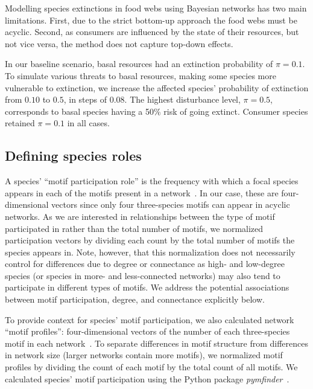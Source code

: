 \documentclass[12pt]{article}
\begin{document}
\begin{spacing}{2.0}
		
		Modelling species extinctions in food webs using Bayesian networks has two main limitations. First, due to the strict bottom-up approach the food webs must be acyclic. 
		Second, as consumers are influenced by the state of their resources, but not vice versa, the method does not capture top-down effects.
		
        In our baseline scenario, basal resources had an extinction probability of $\pi = 0.1$. 
		To simulate various threats to basal resources, making some species more vulnerable to extinction, we increase the affected species' probability of extinction from $0.10$ to $0.5$, in steps of $0.08$. 
		The highest disturbance level, $\pi = 0.5$, corresponds to basal species having a 50\% risk of going extinct. 
		Consumer species retained $\pi=0.1$ in all cases.
		
		
	\subsection*{Defining species roles}

        A species' ``motif participation role'' is the frequency with which a focal species appears in each of the motifs present in a network~\citep{Stouffer2012}.
        In our case, these are four-dimensional vectors since only four three-species motifs can appear in acyclic networks.
        As we are interested in relationships between the type of motif participated in rather than the total number of motifs, we normalized participation vectors by dividing each count by the total number of motifs the species appears in.
        Note, however, that this normalization does not necessarily control for differences due to degree or connectance as high- and low-degree species (or species in more- and less-connected networks) may also tend to participate in different types of motifs.
        We address the potential associations between motif participation, degree, and connectance explicitly below. 
        
        
        To provide context for species' motif participation, we also calculated network ``motif profiles'': four-dimensional vectors of the number of each three-species motif in each network~\citep{Stouffer2012}.
        To separate differences in motif structure from differences in network size (larger networks contain more motifs), we normalized motif profiles by dividing the count of each motif by the total count of all motifs. 
		We calculated species' motif participation using the Python package \emph{pymfinder}~\citep{pymfinder}.



\end{spacing}
\end{document}
